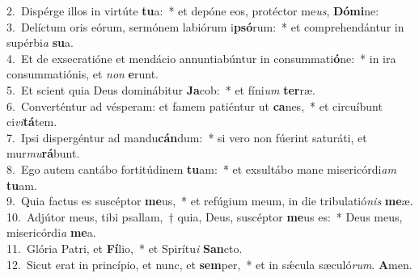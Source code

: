 {2.~}Dispérge illos in virtúte \textbf{tu}a:~* et depóne eos, protéctor me\textit{us}, \textbf{Dó}\textbf{mi}ne:\\
{3.~}Delíctum oris eórum, sermónem labiórum i\textbf{psó}rum:~* et comprehendántur in supérbi\textit{a} \textbf{su}a.\\
{4.~}Et de exsecratióne et mendácio annuntiabúntur in consummati\textbf{ó}ne:~* in ira consummatiónis, et \textit{non} \textbf{e}runt.\\
{5.~}Et scient quia Deus dominábitur \textbf{Ja}cob:~* et fíni\textit{um} \textbf{ter}ræ.\\
{6.~}Converténtur ad vésperam: et famem patiéntur ut \textbf{ca}nes,~* et circuíbunt ci\textit{vi}\textbf{tá}tem.\\
{7.~}Ipsi dispergéntur ad mandu\textbf{cán}dum:~* si vero non fúerint saturáti, et mur\textit{mu}\textbf{rá}bunt.\\
{8.~}Ego autem cantábo fortitúdinem \textbf{tu}am:~* et exsultábo mane misericórdi\textit{am} \textbf{tu}am.\\
{9.~}Quia factus es suscéptor \textbf{me}us,~* et refúgium meum, in die tribulatió\textit{nis} \textbf{me}æ.\\
{10.~}Adjútor meus, tibi psallam,~† quia, Deus, suscéptor \textbf{me}us es:~* Deus meus, misericórdi\textit{a} \textbf{me}a.\\
{11.~}Glória Patri, et \textbf{Fí}lio,~* et Spirítu\textit{i} \textbf{San}cto.\\
{12.~}Sicut erat in princípio, et nunc, et \textbf{sem}per,~* et in sǽcula sæculó\textit{rum}. \textbf{A}men.\\
